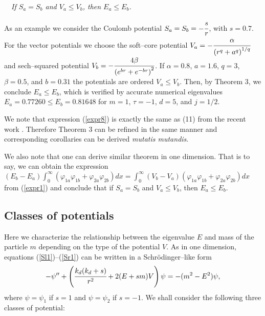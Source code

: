 \documentclass[amsmath,amssymb,superscriptaddress,showkeys, showpacs, aps, nofootinbib]{revtex4}
\begin{document}
\medskip

 ~~{\it If $S_a=S_b$ and $V_a\le V_b$, then $E_a\le E_b$.} 

\medskip

As an example we consider the Coulomb potential $S_a=S_b=-\cfrac{s}{r}$, with $s=0.7$. For the vector potentials we choose the soft--core potential \cite{softcore_1, softcore_2} $V_a=-\cfrac{\alpha}{\left(r^q+a^q\right)^{1/q}}$ and sech--squared potential \cite{sechsquared_4, sechsquared_2, sechsquared_1, sechsquared_3} $V_b=-\cfrac{4\beta}{\left(e^{br}+e^{-br}\right)^2}$. If $\alpha=0.8$, $a=1.6$, $q=3$, $\beta=0.5$, and $b=0.31$ the potentials are ordered $V_a\le V_b$. Then, by Theorem 3, we conclude $E_a\le E_b$, which is verified by accurate numerical eigenvalues $E_a=0.77260\le E_b=0.81648$ for $m=1$, $\tau=-1$, $d=5$, and $j=1/2$.

We note that expression (\ref{expr8}) is exactly the same as (11) from the recent work \cite{Dir}. Therefore Theorem 3 can be refined in the same manner and corresponding corollaries can be derived {\it mutatis mutandis}. 

We also note that one can derive similar theorem in one dimension. That is to say, we can obtain the expression
\\
$(E_b - E_a)\int_0^\infty (\varphi_{1a}\varphi_{1b} + \varphi_{2a}\varphi_{2b})dx=\int_0^\infty(V_b-V_a)(\varphi_{1a}\varphi_{1b}+
\varphi_{2a}\varphi_{2b})dx$ from (\ref{expr1}) and conclude that if $S_a=S_b$ and $V_a\le V_b$, then $E_a\le E_b$. 

\subsection{Classes of potentials}
Here we characterize the relationship between the eigenvalue $E$ and mass of the particle $m$ depending on the type of the potential $V$. As in one dimension, equations (\ref{Sl1})--(\ref{Sr1}) can be written in a Schr\"{o}dinger--like form
\begin{equation}\label{Schd}
-\psi '' +\left(\cfrac{k_d(k_d+s)}{r^2}+2(E+sm)V\right)\psi=-(m^2-E^2)\psi,
\end{equation}
where $\psi=\psi_1$ if $s=1$ and $\psi=\psi_2$ if $s=-1$. We shall consider the following three classes of potential:
\\
 
\end{document}
